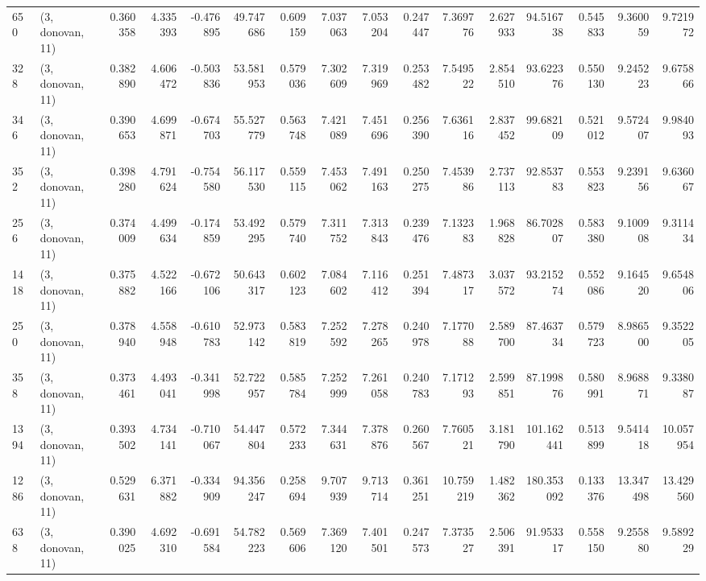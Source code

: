 \begin{tabular}{llrrrrrrrrrrrrrr}
650  &  (3, donovan, 11) &   0.360358 &   4.335393 &  -0.476895 &     49.747686 &    0.609159 &    7.037063 &    7.053204 &  0.247447 &   7.369776 &   2.627933 &    94.516738 &   0.545833 &   9.360059 &   9.721972 \\
328  &  (3, donovan, 11) &   0.382890 &   4.606472 &  -0.503836 &     53.581953 &    0.579036 &    7.302609 &    7.319969 &  0.253482 &   7.549522 &   2.854510 &    93.622376 &   0.550130 &   9.245223 &   9.675866 \\
346  &  (3, donovan, 11) &   0.390653 &   4.699871 &  -0.674703 &     55.527779 &    0.563748 &    7.421089 &    7.451696 &  0.256390 &   7.636116 &   2.837452 &    99.682109 &   0.521012 &   9.572407 &   9.984093 \\
352  &  (3, donovan, 11) &   0.398280 &   4.791624 &  -0.754580 &     56.117530 &    0.559115 &    7.453062 &    7.491163 &  0.250275 &   7.453986 &   2.737113 &    92.853783 &   0.553823 &   9.239156 &   9.636067 \\
256  &  (3, donovan, 11) &   0.374009 &   4.499634 &  -0.174859 &     53.492295 &    0.579740 &    7.311752 &    7.313843 &  0.239476 &   7.132383 &   1.968828 &    86.702807 &   0.583380 &   9.100908 &   9.311434 \\
1418 &  (3, donovan, 11) &   0.375882 &   4.522166 &  -0.672106 &     50.643317 &    0.602123 &    7.084602 &    7.116412 &  0.251394 &   7.487317 &   3.037572 &    93.215274 &   0.552086 &   9.164520 &   9.654806 \\
250  &  (3, donovan, 11) &   0.378940 &   4.558948 &  -0.610783 &     52.973142 &    0.583819 &    7.252592 &    7.278265 &  0.240978 &   7.177088 &   2.589700 &    87.463734 &   0.579723 &   8.986500 &   9.352205 \\
358  &  (3, donovan, 11) &   0.373461 &   4.493041 &  -0.341998 &     52.722957 &    0.585784 &    7.252999 &    7.261058 &  0.240783 &   7.171293 &   2.599851 &    87.199876 &   0.580991 &   8.968871 &   9.338087 \\
1394 &  (3, donovan, 11) &   0.393502 &   4.734141 &  -0.710067 &     54.447804 &    0.572233 &    7.344631 &    7.378876 &  0.260567 &   7.760521 &   3.181790 &   101.162441 &   0.513899 &   9.541418 &  10.057954 \\
1286 &  (3, donovan, 11) &   0.529631 &   6.371882 &  -0.334909 &     94.356247 &    0.258694 &    9.707939 &    9.713714 &  0.361251 &  10.759219 &   1.482362 &   180.353092 &   0.133376 &  13.347498 &  13.429560 \\
638  &  (3, donovan, 11) &   0.390025 &   4.692310 &  -0.691584 &     54.782223 &    0.569606 &    7.369120 &    7.401501 &  0.247573 &   7.373527 &   2.506391 &    91.953317 &   0.558150 &   9.255880 &   9.589229 \\

\end{tabular}

